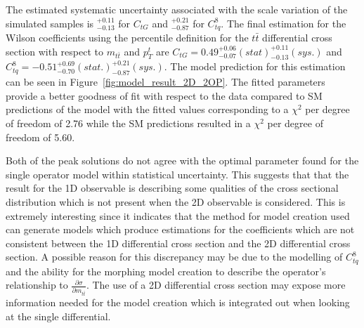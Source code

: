 \documentclass[a4paper,11pt]{article}
\begin{document}
The estimated systematic uncertainty associated with the scale variation of the simulated samples is $^{+0.11}_{-0.13}$ for $C_{tG}$ and $^{+0.21}_{-0.87}$ for $C_{tq}^{8}$. 
The final estimation for the Wilson coefficients using the percentile definition for the $t\bar{t}$ differential cross section with respect to $m_{t\bar{t}}$ and $p_{T}^{t}$ are $C_{tG} = 0.49_{-0.07}^{+0.06}(stat) ^{+0.11}_{-0.13} (sys.)$ and $C_{tq}^{8}=-0.51_{-0.70}^{+0.69} (stat.) ^{+0.21}_{-0.87} (sys.)$.
The model prediction for this estimation can be seen in Figure~\ref{fig:model_result_2D_2OP}.
The fitted parameters provide a better goodness of fit with respect to the data compared to SM predictions of the model with the fitted values corresponding to a $\chi^{2}$ per degree of freedom of 2.76 while the SM predictions resulted in a $\chi^{2}$ per degree of freedom of 5.60.

Both of the peak solutions do not agree with the optimal parameter found for the single operator model within statistical uncertainty.
This suggests that that the result for the 1D observable is describing some qualities of the cross sectional distribution which is not present when the 2D observable is considered.
This is extremely interesting since it indicates that the method for model creation used can generate models which produce estimations for the coefficients which are not consistent between the 1D differential cross section and the 2D differential cross section.
A possible reason for this discrepancy may be due to the modelling of $C_{tq}^{8}$ and the ability for the morphing model creation to describe the operator's relationship to $\frac{\partial \sigma}{\partial m_{t\bar{t}}}$.
The use of a 2D differential cross section may expose more information needed for the model creation which is integrated out when looking at the single differential.
\end{document}
